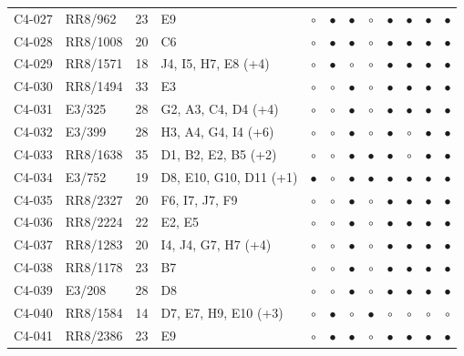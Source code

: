 {\begin{longtable}{llrp{3.9cm}cccccccc}
    C4-027 & RR8/962 & 23 & E9 & $\circ$ & $\bullet$ & $\bullet$ & $\circ$ & $\bullet$ & $\bullet$ & $\bullet$ & $\bullet$ \\
    C4-028 & RR8/1008 & 20 & C6 & $\circ$ & $\bullet$ & $\bullet$ & $\circ$ & $\bullet$ & $\bullet$ & $\bullet$ & $\bullet$ \\
    C4-029 & RR8/1571 & 18 & J4, I5, H7, E8 (+4) & $\circ$ & $\bullet$ & $\circ$ & $\circ$ & $\bullet$ & $\bullet$ & $\bullet$ & $\bullet$ \\
    C4-030 & RR8/1494 & 33 & E3 & $\circ$ & $\circ$ & $\bullet$ & $\circ$ & $\bullet$ & $\bullet$ & $\bullet$ & $\bullet$ \\
    C4-031 & E3/325 & 28 & G2, A3, C4, D4 (+4) & $\circ$ & $\circ$ & $\bullet$ & $\circ$ & $\bullet$ & $\bullet$ & $\bullet$ & $\bullet$ \\
    C4-032 & E3/399 & 28 & H3, A4, G4, I4 (+6) & $\circ$ & $\circ$ & $\bullet$ & $\circ$ & $\bullet$ & $\circ$ & $\bullet$ & $\bullet$ \\
    C4-033 & RR8/1638 & 35 & D1, B2, E2, B5 (+2) & $\circ$ & $\circ$ & $\bullet$ & $\bullet$ & $\bullet$ & $\circ$ & $\bullet$ & $\bullet$ \\
    C4-034 & E3/752 & 19 & D8, E10, G10, D11 (+1) & $\bullet$ & $\circ$ & $\bullet$ & $\bullet$ & $\bullet$ & $\bullet$ & $\bullet$ & $\bullet$ \\
    C4-035 & RR8/2327 & 20 & F6, I7, J7, F9 & $\circ$ & $\circ$ & $\bullet$ & $\circ$ & $\bullet$ & $\bullet$ & $\bullet$ & $\bullet$ \\
    C4-036 & RR8/2224 & 22 & E2, E5 & $\circ$ & $\circ$ & $\bullet$ & $\circ$ & $\bullet$ & $\bullet$ & $\bullet$ & $\bullet$ \\
    C4-037 & RR8/1283 & 20 & I4, J4, G7, H7 (+4) & $\circ$ & $\circ$ & $\bullet$ & $\circ$ & $\bullet$ & $\bullet$ & $\bullet$ & $\bullet$ \\
    C4-038 & RR8/1178 & 23 & B7 & $\circ$ & $\circ$ & $\bullet$ & $\circ$ & $\bullet$ & $\bullet$ & $\bullet$ & $\bullet$ \\
    C4-039 & E3/208 & 28 & D8 & $\circ$ & $\circ$ & $\bullet$ & $\circ$ & $\bullet$ & $\bullet$ & $\bullet$ & $\bullet$ \\
    C4-040 & RR8/1584 & 14 & D7, E7, H9, E10 (+3) & $\circ$ & $\bullet$ & $\circ$ & $\bullet$ & $\circ$ & $\circ$ & $\circ$ & $\circ$ \\
    C4-041 & RR8/2386 & 23 & E9 & $\circ$ & $\bullet$ & $\bullet$ & $\circ$ & $\bullet$ & $\bullet$ & $\bullet$ & $\bullet$ \\

\end{longtable}}

